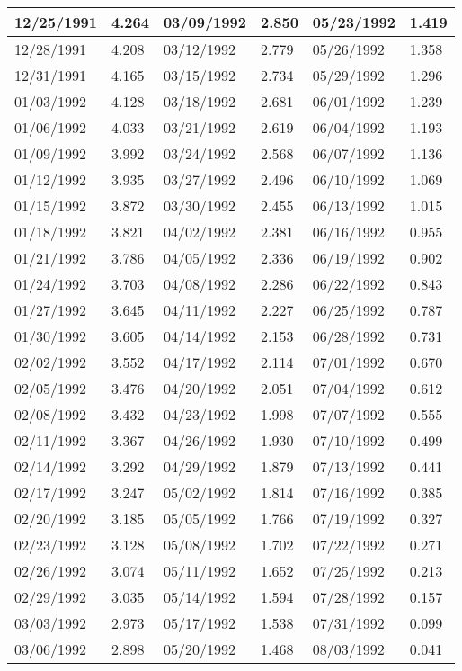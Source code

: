 \begin{tabular}{|l|l|l|l|l|l|}
\hline
12/25/1991 & 4.264  & 03/09/1992 & 2.850  & 05/23/1992 & 1.419  \\
\hline
12/28/1991 & 4.208  & 03/12/1992 & 2.779  & 05/26/1992 & 1.358  \\
\hline
12/31/1991 & 4.165  & 03/15/1992 & 2.734  & 05/29/1992 & 1.296  \\
\hline
01/03/1992 & 4.128  & 03/18/1992 & 2.681  & 06/01/1992 & 1.239  \\
\hline
01/06/1992 & 4.033  & 03/21/1992 & 2.619  & 06/04/1992 & 1.193  \\
\hline
01/09/1992 & 3.992  & 03/24/1992 & 2.568  & 06/07/1992 & 1.136  \\
\hline
01/12/1992 & 3.935  & 03/27/1992 & 2.496  & 06/10/1992 & 1.069  \\
\hline
01/15/1992 & 3.872  & 03/30/1992 & 2.455  & 06/13/1992 & 1.015  \\
\hline
01/18/1992 & 3.821  & 04/02/1992 & 2.381  & 06/16/1992 & 0.955  \\
\hline
01/21/1992 & 3.786  & 04/05/1992 & 2.336  & 06/19/1992 & 0.902  \\
\hline
01/24/1992 & 3.703  & 04/08/1992 & 2.286  & 06/22/1992 & 0.843  \\
\hline
01/27/1992 & 3.645  & 04/11/1992 & 2.227  & 06/25/1992 & 0.787  \\
\hline
01/30/1992 & 3.605  & 04/14/1992 & 2.153  & 06/28/1992 & 0.731  \\
\hline
02/02/1992 & 3.552  & 04/17/1992 & 2.114  & 07/01/1992 & 0.670  \\
\hline
02/05/1992 & 3.476  & 04/20/1992 & 2.051  & 07/04/1992 & 0.612  \\
\hline
02/08/1992 & 3.432  & 04/23/1992 & 1.998  & 07/07/1992 & 0.555  \\
\hline
02/11/1992 & 3.367  & 04/26/1992 & 1.930  & 07/10/1992 & 0.499  \\
\hline
02/14/1992 & 3.292  & 04/29/1992 & 1.879  & 07/13/1992 & 0.441  \\
\hline
02/17/1992 & 3.247  & 05/02/1992 & 1.814  & 07/16/1992 & 0.385  \\
\hline
02/20/1992 & 3.185  & 05/05/1992 & 1.766  & 07/19/1992 & 0.327  \\
\hline
02/23/1992 & 3.128  & 05/08/1992 & 1.702  & 07/22/1992 & 0.271  \\
\hline
02/26/1992 & 3.074  & 05/11/1992 & 1.652  & 07/25/1992 & 0.213  \\
\hline
02/29/1992 & 3.035  & 05/14/1992 & 1.594  & 07/28/1992 & 0.157  \\
\hline
03/03/1992 & 2.973  & 05/17/1992 & 1.538  & 07/31/1992 & 0.099  \\
\hline
03/06/1992 & 2.898  & 05/20/1992 & 1.468  & 08/03/1992 & 0.041  \\
\hline
\end{tabular}
